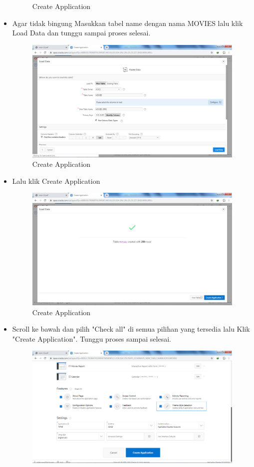 \documentclass[12pt, times new roman]{article}
\begin{document}
\begin{itemize}
\begin{figure}[!htpb]
	\caption{Create Application}
\end{figure}
\item Agar tidak bingung Masukkan tabel name dengan nama MOVIES lalu klik Load Data dan tunggu sampai proses selesai.
\begin{figure}[!htpb]
	\centering
	\includegraphics[width=12cm]{figures/Screenshot_4.png}
	\caption{Create Application}
\end{figure}
\item Lalu klik Create Application
\begin{figure}[!htpb]
	\centering
	\includegraphics[width=12cm]{figures/Screenshot_5.png}
	\caption{Create Application}
\end{figure}
\item Scroll ke bawah dan pilih "Check all" di semua pilihan yang tersedia lalu Klik "Create Application". Tunggu proses sampai selesai.
\begin{figure}[!htpb]
	\centering
	\includegraphics[width=12cm]{figures/Screenshot_6.png}

\end{figure}
\end{itemize}
\end{document}
